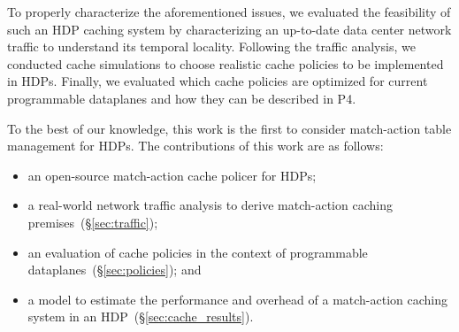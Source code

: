
To properly characterize the aforementioned issues, we evaluated the feasibility of such an HDP caching system by characterizing an up-to-date data center network traffic to understand its temporal locality.
Following the traffic analysis, we conducted cache simulations to choose realistic cache policies to be implemented in HDPs.
Finally, we evaluated which cache policies are optimized for current programmable dataplanes and how they can be described in P4.

To the best of our knowledge, this work is the first to consider match-action table management for HDPs.
The contributions of this work are as follows: 

\begin{itemize}[noitemsep,topsep=0pt]
	\item an open-source match-action cache policer for HDPs;
	\item a real-world network traffic analysis to derive match-action caching premises~(\S\ref{sec:traffic});
	\item an evaluation of cache policies in the context of programmable dataplanes~(\S\ref{sec:policies}); and
	\item a model to estimate the performance and overhead of a match-action caching system in an HDP~(\S\ref{sec:cache_results}).
\end{itemize}
